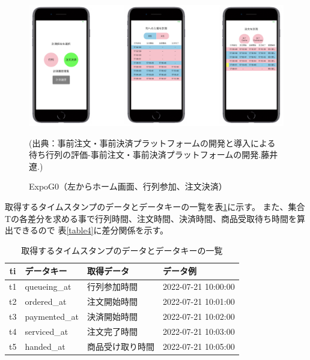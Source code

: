 \documentclass{jsarticle}
\begin{document}
\begin{figure}[H]
  \centering
  \includegraphics[width=14.5cm]{4.png}
  \caption{ExpoG0（左からホーム画面、行列参加、注文決済）}
\scriptsize(出典：事前注文・事前決済プラットフォームの開発と導入による待ち行列の評価-事前注文・事前決済プラットフォームの開発.藤井遼.)
  \label{fig:4}
\end{figure}



取得するタイムスタンプのデータとデータキーの一覧を表\ref{table3}に示す。
また、集合Tの各差分を求める事で行列時間、注文時間、決済時間、商品受取待ち時間を算出できるので
表\ref{table4}に差分関係を示す。



\begin{table}[H]
 \begin{center}
   \caption{取得するタイムスタンプのデータとデータキーの一覧}
   \begin{tabular}{|c|l|l|l|} \hline
ti & データキー     & 取得データ      & データ例 \\ \hline \hline
t1 & queueing\_at  & 行列参加時間    & 2022-07-21 10:00:00 \\ \hline
t2 & ordered\_at   & 注文開始時間    & 2022-07-21 10:01:00 \\ \hline
t3 & paymented\_at & 決済開始時間    & 2022-07-21 10:02:00 \\ \hline
t4 & serviced\_at  & 注文完了時間    & 2022-07-21 10:03:00 \\ \hline
t5 & handed\_at    & 商品受け取り時間 & 2022-07-21 10:05:00 \\ \hline
  \end{tabular}
 \label{table3}
 \end{center}
\end{table}
\end{document}

